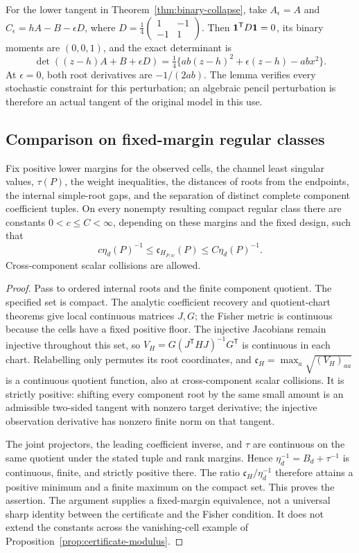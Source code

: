 For the lower tangent in Theorem~\ref{thm:binary-collapse}, take
$A_\epsilon=A$ and $C_\epsilon=hA-B-\epsilon D$, where
$D=\tfrac14\left(\begin{smallmatrix}1&-1\\-1&1\end{smallmatrix}\right)$.
Then $\mathbf 1^{\mathsf T}D\mathbf 1=0$, its binary moments are $(0,0,1)$,
and the exact determinant is
\[
 \det((z-h)A+B+\epsilon D)
    =\tfrac14\{ab(z-h)^2+\epsilon(z-h)-abx^2\}.
\]
At $\epsilon=0$, both root derivatives are $-1/(2ab)$.
The lemma verifies every stochastic constraint for this perturbation;
an algebraic pencil perturbation is therefore an actual tangent of
the original model in this use.

\subsection{Comparison on fixed-margin regular classes}
\begin{proposition}\label{prop:compact-eta-v93}
Fix positive lower margins for the observed cells, the channel least
singular values, $\tau(P)$, the weight inequalities, the distances of
roots from the endpoints, the internal simple-root gaps, and the
separation of distinct complete component coefficient tuples.
On every nonempty resulting compact regular class there are constants
$0<c\le C<\infty$, depending on these margins and the fixed design,
such that
\[
 c\eta_d(P)^{-1}\le
 \mathfrak c_{H_{P,w}}(P)\le C\eta_d(P)^{-1}.
\]
Cross-component scalar collisions are allowed.
\end{proposition}
\begin{proof}
Pass to ordered internal roots and the finite component quotient.
The specified set is compact. The analytic coefficient recovery
and quotient-chart theorems give local continuous matrices $J,G$;
the Fisher metric is continuous because the cells have a fixed
positive floor. The injective Jacobians remain injective throughout
this set, so $V_H=G(J^{\mathsf T}HJ)^{-1}G^{\mathsf T}$ is continuous
in each chart. Relabelling only permutes its root coordinates, and
$\mathfrak c_H=\max_a\sqrt{(V_H)_{aa}}$ is a continuous quotient
function, also at cross-component scalar collisions.
It is strictly positive: shifting every component root by the same
small amount is an admissible two-sided tangent with nonzero target
derivative; the injective observation derivative has nonzero finite
norm on that tangent.

The joint projectors, the leading coefficient inverse, and $\tau$
are continuous on the same quotient under the stated tuple and rank
margins. Hence $\eta_d^{-1}=B_d+\tau^{-1}$ is continuous, finite,
and strictly positive there. The ratio
$\mathfrak c_H/\eta_d^{-1}$ therefore attains a positive minimum
and a finite maximum on the compact set. This proves the assertion.
The argument supplies a fixed-margin equivalence, not a universal
sharp identity between the certificate and the Fisher condition.
It does not extend the constants across the vanishing-cell example
of Proposition~\ref{prop:certificate-modulus}.
\end{proof}
